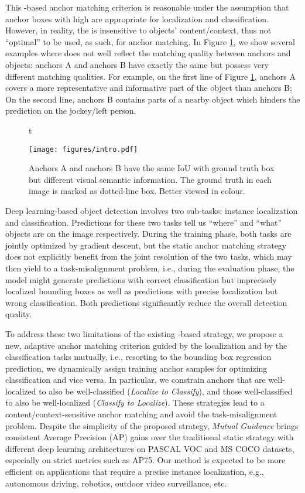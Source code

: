 \documentclass[runningheads]{llncs}
\begin{document}
This -based anchor matching criterion is reasonable under the assumption that anchor boxes with high  are appropriate for localization and classification. However, in reality, the  is insensitive to objects' content/context, thus not ``optimal'' to be used, as such, for anchor matching.
In Figure \ref{fig:intro}, we show several examples where  does not well reflect the matching quality between anchors and objects: anchors A and anchors B have exactly the same  but possess very different matching qualities. For example, on the first line of Figure \ref{fig:intro}, anchors A covers a more representative and informative part of the object than anchors B; On the second line, anchors B contains parts of a nearby object which hinders the prediction on the jockey/left person.

\begin{figure}[t]t
\begin{center}
\texttt{[image: figures/intro.pdf]}
\end{center}
\caption{Anchors A and anchors B have the same IoU with ground truth box but different visual semantic information. The ground truth in each image is marked as dotted-line box. Better viewed in colour.}
\label{fig:intro}
\end{figure}

Deep learning-based object detection involves two sub-tasks: instance localization and classification. Predictions for these two tasks tell us ``where'' and ``what'' objects are on the image respectively.
During the training phase, both tasks are jointly optimized by gradient descent, but the static anchor matching strategy does not explicitly benefit from the joint resolution of the two tasks, which may then yield to a task-misalignment problem, i.e., during the evaluation phase, the model might generate predictions with correct classification but imprecisely localized bounding boxes as well as predictions with precise localization but wrong classification. Both predictions significantly reduce the overall detection quality.

To address these two limitations of the existing -based strategy, we propose a new, adaptive anchor matching criterion guided by the localization and by the classification tasks mutually, i.e., resorting to the bounding box regression prediction, we dynamically assign training anchor samples for optimizing classification and vice versa.
In particular, we constrain anchors that are well-localized to also be well-classified (\emph{Localize to Classify}), and those well-classified to also be well-localized (\emph{Classify to Localize}).
These strategies lead to a content/context-sensitive anchor matching and avoid the task-misalignment problem.
Despite the simplicity of the proposed strategy, \emph{Mutual Guidance} brings consistent Average Precision (AP) gains over the traditional static strategy with different deep learning architectures on PASCAL VOC \cite{VOC} and MS COCO \cite{COCO} datasets, especially on strict metrics such as AP75.
Our method is expected to be more efficient on applications that require a precise instance localization, e.g., autonomous driving, robotics, outdoor video surveillance, etc.
\end{document}
